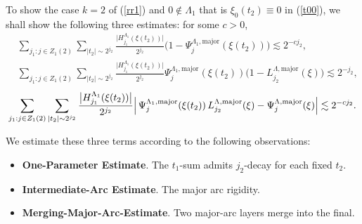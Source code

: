 \documentclass[11 pt,letterpaper]{amsart}
\theoremstyle{plain}
\theoremstyle{definition}
\theoremstyle{remark} \theoremstyle{exam} \theoremstyle{ob}
\numberwithin{equation}{section}
\begin{document}
 

To show the case $k=2$ of (\ref{rr1}) and $0\notin \Lambda_1$  that is $\xi_0(t_2)\equiv 0$ in (\ref{t00}), 
 we shall show  the following three estimates: for some $c>0$,
\begin{align}
&\sum_{j_1 : j \in Z_1(2)} 
  \sum_{|t_2|\sim 2^{j_2}}
  \frac{\bigl|H^{\Lambda_1}_{j_1}(\xi(t_2))\bigr|}{2^{j_2}}
  \bigl(1 - \Psi_{j}^{\Lambda_1,\mathrm{major}}(\xi(t_2))\bigr)\lesssim 2^{-c j_2}, 
  \label{283a} \\
&\sum_{j_1 : j \in Z_1(2)} 
  \sum_{|t_2|\sim 2^{j_2}}
  \frac{\bigl|H^{\Lambda_1}_{j_1}(\xi(t_2))\bigr|}{2^{j_2}}
  \Psi_{j}^{\Lambda_1,\mathrm{major}}\!\left(\xi(t_2)\right)
  \bigl(1 - L^{\Lambda,\mathrm{major}}_{j_2}(\xi)\bigr)\lesssim 2^{-j_2},\label{283b}
\end{align}
\begin{equation}
	\sum_{j_1 : j \in Z_1(2)} 
	\sum_{|t_2|\sim 2^{j_2}}
	\frac{\bigl|H^{\Lambda_1}_{j_1}(\xi(t_2))\bigr|}{2^{j_2}} 
	\Bigl|\,
	\Psi_j^{\Lambda_1,\mathrm{major}}\!\left(\xi(t_2)\right)
	L^{\Lambda,\mathrm{major}}_{j_2}(\xi)
	- \Psi_j^{\Lambda,\mathrm{major}}(\xi)
	\Bigr|\lesssim 2^{-cj_2}.\label{283c}
\end{equation}

 We estimate these three terms according to the following observations:
\begin{itemize}
\item[\eqref{283a}] \textbf{One-Parameter Estimate}. The $t_1$-sum admits $j_2$-decay  for each fixed $t_2$.
\item[\eqref{283b}] \textbf{Intermediate-Arc Estimate}. The major arc rigidity.
\item[\eqref{283c}] \textbf{Merging-Major-Arc-Estimate}. Two major-arc layers merge into the final.
\end{itemize}
\end{document}
